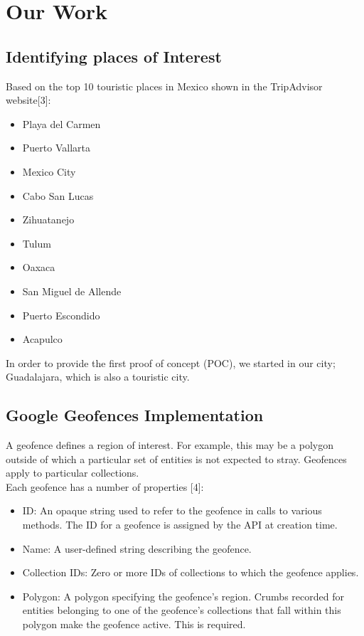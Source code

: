 \section{Our Work}


\subsection{Identifying places of Interest}
Based on the top 10 touristic places in Mexico shown in the TripAdvisor website[3]: \\

\begin{itemize}
  \item Playa del Carmen
  \item Puerto Vallarta
  \item Mexico City
  \item Cabo San Lucas
  \item Zihuatanejo
  \item Tulum
  \item Oaxaca
  \item San Miguel de Allende
  \item Puerto Escondido
  \item Acapulco
\end{itemize}


In order to provide the first proof of concept (POC), we started in our city; Guadalajara, which is also a 
touristic city.


\subsection{Google Geofences Implementation}
A geofence defines a region of interest. For example, this may be a polygon outside of which a particular set of entities is not expected to stray. Geofences apply to particular collections.\\

Each geofence has a number of properties [4]:

\begin{itemize}
  \item ID: An opaque string used to refer to the geofence in calls to various methods. The ID for a geofence is assigned by the API at creation time. 

  \item Name: A user-defined string describing the geofence.

  \item Collection IDs: Zero or more IDs of collections to which the geofence applies. 

  \item Polygon: A polygon specifying the geofence's region. Crumbs recorded for entities belonging to one of the geofence's collections that fall within this polygon make the geofence active. This is required. 
\end{itemize}

